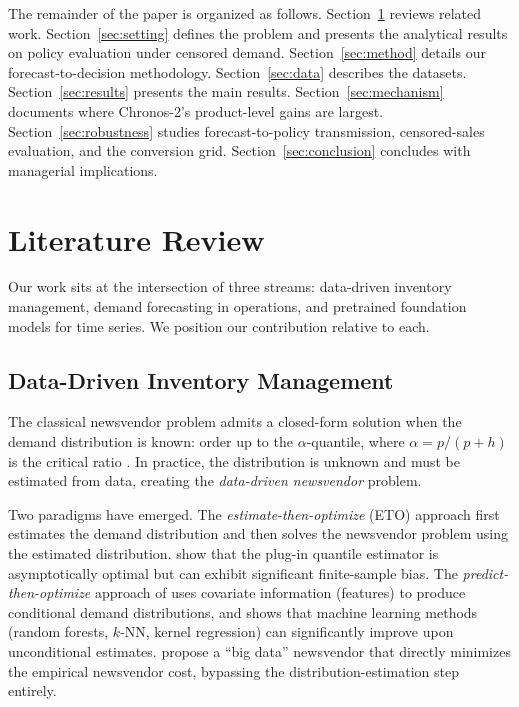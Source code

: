 \documentclass[msom,dblanonrev]{informs4}
\begin{document}
The remainder of the paper is organized as follows.
Section~\ref{sec:lit} reviews related work.
Section~\ref{sec:setting} defines the problem and presents the analytical results on policy evaluation under censored demand.
Section~\ref{sec:method} details our forecast-to-decision methodology.
Section~\ref{sec:data} describes the datasets.
Section~\ref{sec:results} presents the main results.
Section~\ref{sec:mechanism} documents where Chronos-2's product-level gains are largest.
Section~\ref{sec:robustness} studies forecast-to-policy transmission, censored-sales evaluation, and the conversion grid.
Section~\ref{sec:conclusion} concludes with managerial implications.


\section{Literature Review}\label{sec:lit}

Our work sits at the intersection of three streams: data-driven inventory management, demand forecasting in operations, and pretrained foundation models for time series.
We position our contribution relative to each.

\subsection{Data-Driven Inventory Management}

The classical newsvendor problem admits a closed-form solution when the demand distribution is known: order up to the $\alpha$-quantile, where $\alpha = p/(p+h)$ is the critical ratio \citep{Porteus2002}.
In practice, the distribution is unknown and must be estimated from data, creating the \emph{data-driven newsvendor} problem.

Two paradigms have emerged.
The \emph{estimate-then-optimize} (ETO) approach first estimates the demand distribution and then solves the newsvendor problem using the estimated distribution.
\citet{Liyanage2005} show that the plug-in quantile estimator is asymptotically optimal but can exhibit significant finite-sample bias.
The \emph{predict-then-optimize} approach of \citet{BertsimasKallus2020} uses covariate information (features) to produce conditional demand distributions, and shows that machine learning methods (random forests, $k$-NN, kernel regression) can significantly improve upon unconditional estimates.
\citet{BanRudin2019} propose a ``big data'' newsvendor that directly minimizes the empirical newsvendor cost, bypassing the distribution-estimation step entirely.
\end{document}
